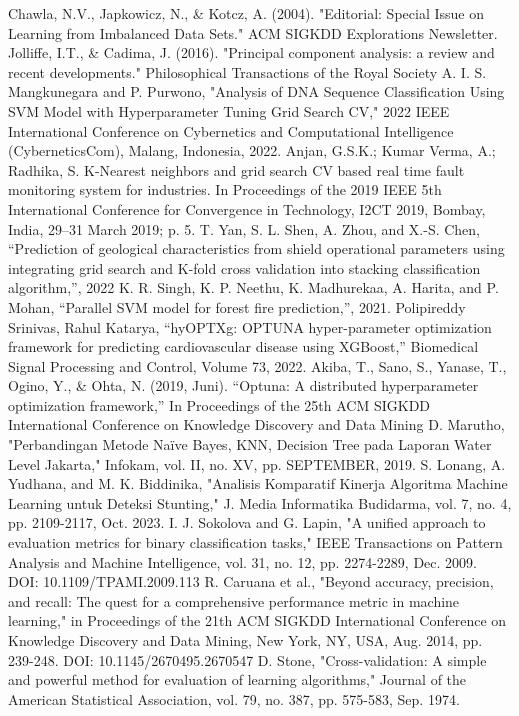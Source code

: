 \documentclass[conference]{IEEEtran}
\begin{document}
\begin{thebibliography}{00}
 Chawla, N.V., Japkowicz, N., \& Kotcz, A. (2004). "Editorial: Special Issue on Learning from Imbalanced Data Sets." ACM SIGKDD Explorations Newsletter.
 Jolliffe, I.T., \& Cadima, J. (2016). "Principal component analysis: a review and recent developments." Philosophical Transactions of the Royal Society A.
 I. S. Mangkunegara and P. Purwono, "Analysis of DNA Sequence Classification Using SVM Model with Hyperparameter Tuning Grid Search CV," 2022 IEEE International Conference on Cybernetics and Computational Intelligence (CyberneticsCom), Malang, Indonesia, 2022.
 Anjan, G.S.K.; Kumar Verma, A.; Radhika, S. K-Nearest neighbors and grid search CV based real time fault monitoring system for industries. In Proceedings of the 2019 IEEE 5th International Conference for Convergence in Technology, I2CT 2019, Bombay, India, 29–31 March 2019; p. 5.
 T. Yan, S. L. Shen, A. Zhou, and X.-S. Chen, “Prediction of geological characteristics from shield operational parameters using integrating grid search and K-fold cross validation into stacking classification algorithm,”, 2022
 K. R. Singh, K. P. Neethu, K. Madhurekaa, A. Harita, and P. Mohan, “Parallel SVM model for forest fire prediction,”, 2021.
 Polipireddy Srinivas, Rahul Katarya, “hyOPTXg: OPTUNA hyper-parameter optimization framework for predicting cardiovascular disease using XGBoost,” Biomedical Signal Processing and Control, Volume 73, 2022.
 Akiba, T., Sano, S., Yanase, T., Ogino, Y., \& Ohta, N. (2019, Juni). “Optuna: A distributed hyperparameter optimization framework,” In Proceedings of the 25th ACM SIGKDD International Conference on Knowledge Discovery and Data Mining
 D. Marutho, "Perbandingan Metode Naïve Bayes, KNN, Decision Tree pada Laporan Water Level Jakarta," Infokam, vol. II, no. XV, pp. SEPTEMBER, 2019.
 S. Lonang, A. Yudhana, and M. K. Biddinika, "Analisis Komparatif Kinerja Algoritma Machine Learning untuk Deteksi Stunting," J. Media Informatika Budidarma, vol. 7, no. 4, pp. 2109-2117, Oct. 2023.
 I. J. Sokolova and G. Lapin, "A unified approach to evaluation metrics for binary classification tasks," IEEE Transactions on Pattern Analysis and Machine Intelligence, vol. 31, no. 12, pp. 2274-2289, Dec. 2009. DOI: 10.1109/TPAMI.2009.113
 R. Caruana et al., "Beyond accuracy, precision, and recall: The quest for a comprehensive performance metric in machine learning," in Proceedings of the 21th ACM SIGKDD International Conference on Knowledge Discovery and Data Mining, New York, NY, USA, Aug. 2014, pp. 239-248. DOI: 10.1145/2670495.2670547
 D. Stone, "Cross-validation: A simple and powerful method for evaluation of learning algorithms," Journal of the American Statistical Association, vol. 79, no. 387, pp. 575-583, Sep. 1974.

\end{thebibliography}
\vspace{12pt}
\end{document}
